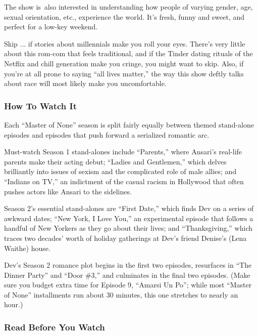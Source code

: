 The show is~also interested in understanding how people of varying
gender, age, sexual orientation, etc., experience the world. It's fresh,
funny and sweet, and perfect for a low-key weekend.

Skip ... if stories about millennials make you roll your eyes. There's
very little about this rom-com that feels traditional, and if the Tinder
dating rituals of the Netflix and chill generation make you cringe, you
might want to skip. Also, if you're at all prone to saying ``all lives
matter,'' the way this show deftly talks about race will most likely
make you uncomfortable.

\hypertarget{how-to-watch-it}{%
\subsubsection{How To Watch It}\label{how-to-watch-it}}

Each ``Master of None'' season is split fairly equally between themed
stand-alone episodes and episodes that push forward a serialized
romantic arc.

Must-watch Season 1 stand-alones include ``Parents,'' where Ansari's
real-life parents make their acting debut; ``Ladies and Gentlemen,''
which delves brilliantly into issues of sexism and the complicated role
of male allies; and ``Indians on TV,'' an indictment of the casual
racism in Hollywood that often pushes actors like Ansari to the
sidelines.

Season 2's essential stand-alones are ``First Date,'' which finds Dev on
a series of awkward dates; ``New York, I Love You,'' an experimental
episode that follows a handful of New Yorkers as they go about their
lives; and ``Thanksgiving,'' which traces two decades' worth of holiday
gatherings at Dev's friend Denise's (Lena Waithe) house.

Dev's Season 2 romance plot begins in the first two episodes, resurfaces
in ``The Dinner Party'' and ``Door \#3,'' and culminates in the final
two episodes. (Make sure you budget extra time for Episode 9, ``Amarsi
Un Po''; while most ``Master of None'' installments run about 30
minutes, this one stretches to nearly an hour.)

\hypertarget{read-before-you-watch}{%
\subsubsection{Read Before You Watch}\label{read-before-you-watch}}

\href{http://www.nytimes.com/2015/11/06/arts/television/review-aziz-ansari-in-master-of-none-negotiates-technology-and-social-mores.html}{}

